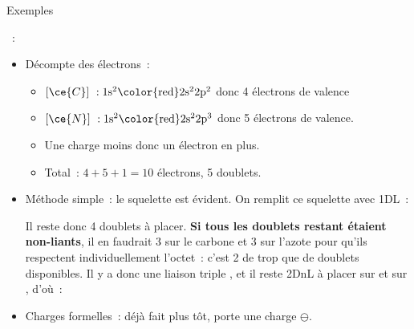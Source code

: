 \documentclass[../main/main.tex]{subfiles}
\begin{document}
\begin{rexem}{Exemples}
    \begin{enumerate}[resume]
        ~:
            \begin{itemize}[label=$\triangleright$, leftmargin=20pt]
                \item Décompte des électrons~:
                    \begin{itemize}[label=$\ra$, leftmargin=20pt]
                        \item $[\ce{C}]~: \rm 1s^2\color{red}2s^22p^2$
                            donc 4 électrons de valence
                        \item $[\ce{N}]~: \rm 1s^2\color{red}2s^22p^3$
                            donc 5 électrons de valence.
                        \item Une charge moins donc un électron en plus.
                        \item Total~: $4 + 5 + 1 = 10$ électrons, 5
                            doublets.
                    \end{itemize}
                \item Méthode simple~: le squelette est évident.
                    On remplit ce squelette avec 1DL~:
                    \begin{center}
                    \end{center}
                    Il reste donc 4 doublets à placer. \textbf{Si tous les
                    doublets restant étaient non-liants}, il en faudrait 3 sur
                    le carbone et 3 sur l'azote pour qu'ils respectent
                    individuellement l'octet~: c'est 2 de trop que de doublets
                    disponibles. Il y a donc une liaison triple , et il
                    reste 2DnL à placer sur  et sur , d'où~:
                    \begin{center}
                    \end{center}
                \item Charges formelles~: déjà fait plus tôt,  porte une
                    charge $\ominus$.
            \end{itemize}
    \end{enumerate}
    \begin{center}

\end{center}
\end{rexem}
\end{document}

